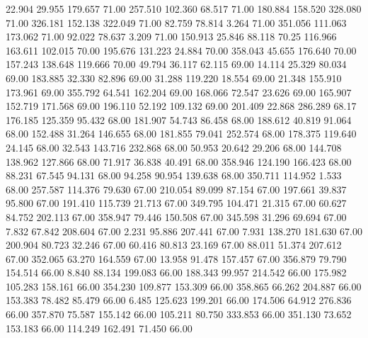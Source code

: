   22.904   29.955  179.657        71.00
 257.510  102.360   68.517        71.00
 180.884  158.520  328.080        71.00
 326.181  152.138  322.049        71.00
  82.759   78.814    3.264        71.00
 351.056  111.063  173.062        71.00
  92.022   78.637    3.209        71.00
 150.913   25.846   88.118        70.25
 116.966  163.611  102.015        70.00
 195.676  131.223   24.884        70.00
 358.043   45.655  176.640        70.00
 157.243  138.648  119.666        70.00
  49.794   36.117   62.115        69.00
  14.114   25.329   80.034        69.00
 183.885   32.330   82.896        69.00
  31.288  119.220   18.554        69.00
  21.348  155.910  173.961        69.00
 355.792   64.541  162.204        69.00
 168.066   72.547   23.626        69.00
 165.907  152.719  171.568        69.00
 196.110   52.192  109.132        69.00
 201.409   22.868  286.289        68.17
 176.185  125.359   95.432        68.00
 181.907   54.743   86.458        68.00
 188.612   40.819   91.064        68.00
 152.488   31.264  146.655        68.00
 181.855   79.041  252.574        68.00
 178.375  119.640   24.145        68.00
  32.543  143.716  232.868        68.00
  50.953   20.642   29.206        68.00
 144.708  138.962  127.866        68.00
  71.917   36.838   40.491        68.00
 358.946  124.190  166.423        68.00
  88.231   67.545   94.131        68.00
  94.258   90.954  139.638        68.00
 350.711  114.952    1.533        68.00
 257.587  114.376   79.630        67.00
 210.054   89.099   87.154        67.00
 197.661   39.837   95.800        67.00
 191.410  115.739   21.713        67.00
 349.795  104.471   21.315        67.00
  60.627   84.752  202.113        67.00
 358.947   79.446  150.508        67.00
 345.598   31.296   69.694        67.00
   7.832   67.842  208.604        67.00
   2.231   95.886  207.441        67.00
   7.931  138.270  181.630        67.00
 200.904   80.723   32.246        67.00
  60.416   80.813   23.169        67.00
  88.011   51.374  207.612        67.00
 352.065   63.270  164.559        67.00
  13.958   91.478  157.457        67.00
 356.879   79.790  154.514        66.00
   8.840   88.134  199.083        66.00
 188.343   99.957  214.542        66.00
 175.982  105.283  158.161        66.00
 354.230  109.877  153.309        66.00
 358.865   66.262  204.887        66.00
 153.383   78.482   85.479        66.00
   6.485  125.623  199.201        66.00
 174.506   64.912  276.836        66.00
 357.870   75.587  155.142        66.00
 105.211   80.750  333.853        66.00
 351.130   73.652  153.183        66.00
 114.249  162.491   71.450        66.00
